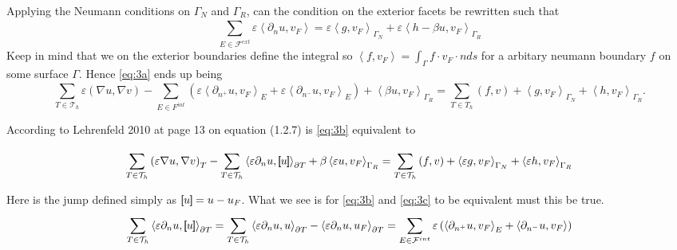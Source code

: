 Applying the Neumann conditions on $ \Gamma _{N} $ and $\Gamma _{R}$, can the condition on the exterior facets
be rewritten such that
\[
\sum_{E \in \mathcal{F} ^{ext}}^{}  \varepsilon \left< \partial _{n} u, v_{F} \right> = \varepsilon \left<g,v_{F}
\right> _{\Gamma _{N}} + \varepsilon \left<h - \beta u, v_{F} \right> _{\Gamma _{R}}
\]
Keep in mind that we on the exterior boundaries define the integral so $\left<f, v_{F} \right> = \int_{\Gamma }^{} f
\cdot v_{F} \cdot n ds $ for a arbitary neumann boundary $f$ on some surface $\Gamma $. Hence \eqref{eq:3a} ends up
being
\begin{equation}
\label{eq:3b}
 \sum_{T \in \mathcal{T}_{h} }^{} \varepsilon \left( \nabla u , \nabla v \right)  - \sum_{E \in F^{int}}^{} \left(
\varepsilon  \left<\partial _{n^{+}} u , v_{F} \right> _{E} + \varepsilon \left<\partial _{n^{-}}  u, v_{F}\right>_{E}
\right) + \left<\beta u, v_{F} \right> _{\Gamma _{R}} = \sum_{T \in T_{h}}^{} \left( f,v \right)   + \left<g, v_{F}
\right>_{\Gamma _{N}} + \left<h, v_{F} \right>_{\Gamma _{R}}
.\end{equation}

According to Lehrenfeld 2010  \cite{lehrenfeld2010} at page 13 on equation (1.2.7)  is \eqref{eq:3b} equivalent to

\begin{equation}
\label{eq:3c}
\sum_{T \in \mathcal{T} _{h}}^{}   \left( \varepsilon \nabla u, \nabla v \right) _{T} -\sum_{T \in \mathcal{T} _{h}}^{}    \left<\varepsilon  \partial
_{n} u , \left[\!\!\left[  u  \right]\!\!\right] \right> _{\partial T}  + \beta  \left< \varepsilon u, v_{F}  \right>_{\Gamma _{R}} = \sum_{T
\in \mathcal{T} _{h}}^{} \left( f,v \right)  + \left<\varepsilon g, v_{F} \right>_{\Gamma _{N}} + \left<\varepsilon h,
v_{F} \right>_{\Gamma _{R}}
\end{equation}


Here is the jump defined simply as $\left[\!\!\left[ u \right]\!\!\right] = u - u_{F}$. What we see is for \eqref{eq:3b} and \eqref{eq:3c} to be
equivalent must this be true. \[
    \sum_{T \in \mathcal{T} _{h}}^{}  \left< \varepsilon \partial _{n} u, \left[\!\!\left[ u \right]\!\!\right]  \right>_{\partial T} = \sum_{T \in
    \mathcal{T} _{h}}^{}  \left< \varepsilon \partial _{n} u, u  \right>_{\partial T} - \left< \varepsilon
    \partial _{n} u, u_{F}  \right>_{\partial T} =\sum_{E \in
    \mathcal{F} ^{int}}^{}  \varepsilon \left( \left< \partial _{n^{+}} u, v_{F} \right>_{E}  + \left<\partial _{n^{-}}
u, v_{F}\right> \right)
\]










